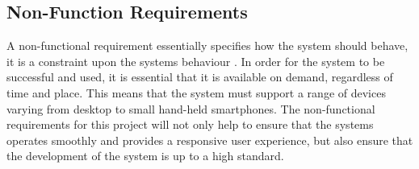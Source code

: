 \subsection{Non-Function Requirements}
A non-functional requirement essentially specifies how the system should behave, it is a constraint upon the systems behaviour \cite{ReQTest:Requirements}. In order for the system to be successful and used, it is essential that it is available on demand, regardless of time and place. This means that the system must support a range of devices varying from desktop to small hand-held smartphones. The non-functional requirements for this project will not only help to ensure that the systems operates smoothly and provides a responsive user experience, but also ensure that the development of the system is up to a high standard.

